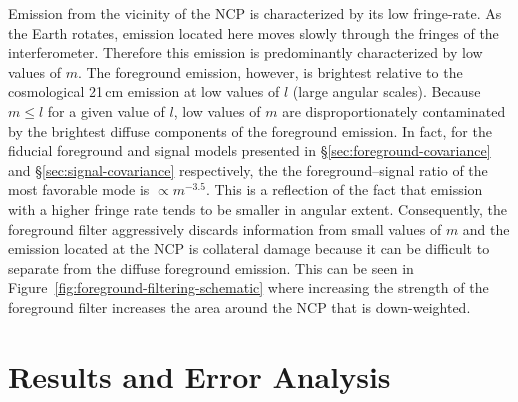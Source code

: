 \begin{bibunit}
Emission from the vicinity of the NCP is characterized by its low fringe-rate. As the Earth rotates,
emission located here moves slowly through the fringes of the interferometer. Therefore this
emission is predominantly characterized by low values of $m$. The foreground emission, however, is
brightest relative to the cosmological 21\,cm emission at low values of $l$ (large angular scales).
Because $m \le l$ for a given value of $l$, low values of $m$ are disproportionately contaminated by
the brightest diffuse components of the foreground emission. In fact, for the fiducial foreground
and signal models presented in \S\ref{sec:foreground-covariance} and \S\ref{sec:signal-covariance}
respectively, the the foreground--signal ratio of the most favorable mode is $\propto m^{-3.5}$.
This is a reflection of the fact that emission with a higher fringe rate tends to be smaller in
angular extent.  Consequently, the foreground filter aggressively discards information from small
values of $m$ and the emission located at the NCP is collateral damage because it can be difficult
to separate from the diffuse foreground emission. This can be seen in
Figure~\ref{fig:foreground-filtering-schematic} where increasing the strength of the foreground
filter increases the area around the NCP that is down-weighted.

\section{Results and Error Analysis}\label{sec:results}


\end{bibunit}
